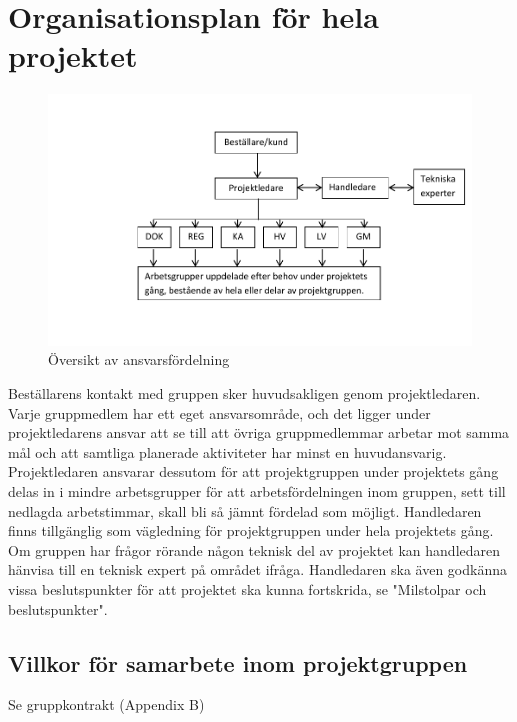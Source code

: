 \documentclass[a4paper,12pt]{article}
\begin{document}
\section{Organisationsplan för hela projektet}	%
\begin{figure}[h]
        \includegraphics{organisation-figur.pdf}
	\caption{Översikt av ansvarsfördelning}
\end{figure}
Beställarens kontakt med gruppen sker huvudsakligen genom projektledaren. Varje gruppmedlem har ett eget ansvarsområde, och det ligger under projektledarens ansvar att se till att övriga gruppmedlemmar arbetar mot samma mål och att samtliga planerade aktiviteter har minst en huvudansvarig. Projektledaren ansvarar dessutom för att projektgruppen under projektets gång  delas in i mindre arbetsgrupper för att arbetsfördelningen inom gruppen, sett till nedlagda arbetstimmar,  skall bli så jämnt fördelad som möjligt.
Handledaren finns tillgänglig som vägledning för projektgruppen under hela projektets gång. Om gruppen har frågor rörande någon teknisk del av projektet kan handledaren hänvisa till en teknisk expert på området ifråga. Handledaren ska även godkänna vissa beslutspunkter för att projektet ska kunna fortskrida, se "Milstolpar och beslutspunkter".

\subsection{Villkor för samarbete inom projektgruppen}
Se gruppkontrakt (Appendix B)
\end{document}
